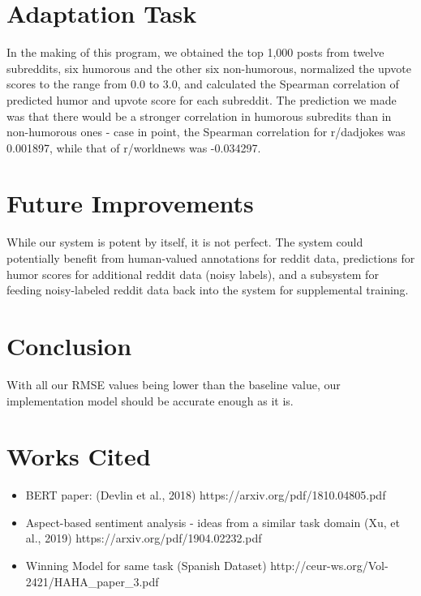 \documentclass{article}
\begin{document}
\section{Adaptation Task}
In the making of this program, we obtained the top 1,000 posts from twelve subreddits, six humorous and the other six non-humorous, normalized the upvote scores to the range from 0.0 to 3.0, and calculated the Spearman correlation of predicted humor and upvote score for each subreddit. The prediction we made was that there would be a stronger correlation in humorous subredits than in non-humorous ones - case in point, the Spearman correlation for r/dadjokes was 0.001897, while that of r/worldnews was -0.034297.

\section{Future Improvements}
While our system is potent by itself, it is not perfect. The system could potentially benefit from human-valued annotations for reddit data, predictions for humor scores for additional reddit data (noisy labels), and a subsystem for feeding noisy-labeled reddit data back into the system for supplemental training.

\section{Conclusion}

With all our RMSE values being lower than the baseline value, our implementation model should be accurate enough as it is.

\section{Works Cited}
\begin{itemize}
\item BERT paper: (Devlin et al., 2018) https://arxiv.org/pdf/1810.04805.pdf
\item Aspect-based sentiment analysis - ideas from a similar task domain (Xu, et al., 2019) https://arxiv.org/pdf/1904.02232.pdf
\item Winning Model for same task (Spanish Dataset) http://ceur-ws.org/Vol-2421/HAHA\_paper\_3.pdf
\end{itemize}



\end{document}
